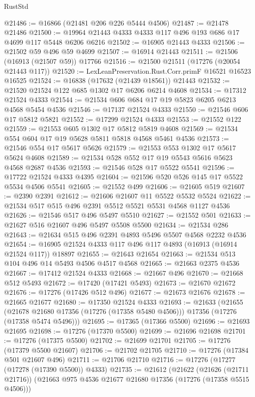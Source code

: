 \begin{lexlean}{RustStd}
\begin{coremodule}
@21486 := @16866 (@21481 @206 @226 @5444 @4506)
@21487 := @21478 @21486
@21500 := @19964 @21443 @4333 @4333 @117 @496 @193 @686 @17 @4699 @117 @5448 @6206 @6216
@21502 := @16905 @21443 @4333
@21506 := @21502 @59 @496 @59 @4699
@21507 := @16914 @21443
@21511 := @21506 (@16913 (@21507 @59)) @17766
@21516 := @21500 @21511 (@17276 (@20054 @21443 @117))
@21520 := LexLeanPreservation.Rust.Corr.primF @16521 @16523 @16525
@21524 := @16838 (@17632 (@21439 @18561)) @21443
@21532 := @21520 @21524 @122 @685 @1302 @17 @6206 @6214 @4608
@21534 := @17312 @21524 @4333
@21544 := @21534 @606 @684 @17 @19 @5823 @6205 @6213 @4568 @5454 @4536
@21546 := @17137 @21524 @4333
@21550 := @21546 @606 @17 @5812 @5821
@21552 := @17299 @21524 @4333
@21553 := @21552 @122
@21559 := @21553 @605 @1302 @17 @5812 @5819 @4608
@21569 := @21534 @554 @604 @17 @19 @5628 @5811 @5818 @4568 @5461 @4536
@21573 := @21546 @554 @17 @5617 @5626
@21579 := @21553 @553 @1302 @17 @5617 @5624 @4608
@21589 := @21534 @528 @552 @17 @19 @5543 @5616 @5623 @4568 @2687 @4536
@21593 := @21546 @528 @17 @5522 @5541
@21596 := @17722 @21524 @4333 @4395
@21604 := @21596 @520 @526 @145 @17 @5522 @5534 @4506 @5541
@21605 := @21552 @499
@21606 := @21605 @519
@21607 := @2390 @2391
@21612 := @21606 @21607 @11 @5522 @5532 @5524
@21622 := @21534 @517 @515 @496 @2391 @5512 @5521 @5531 @4568 @1127 @4536
@21626 := @21546 @517 @496 @5497 @5510
@21627 := @21552 @501
@21633 := @21627 @516 @21607 @496 @5497 @5508 @5500
@21634 := @21534 @286
@21643 := @21634 @515 @496 @2391 @4893 @5496 @5507 @4568 @2232 @4536
@21654 := @16905 @21524 @4333 @117 @496 @117 @4893 (@16913 (@16914 @21524 @117)) @18897
@21655 := @21643 @21654
@21663 := @21534 @513 @104 @496 @14 @5493 @4506 @4517 @4568
@21665 := @21663 @2375 @4536
@21667 := @17412 @21524 @4333
@21668 := @21667 @496
@21670 := @21668 @512 @5493
@21672 := @17420 (@17421 @5493)
@21673 := @21670 @21672
@21676 := @17276 (@17426 @512 @496)
@21677 := @21673 @21676
@21678 := @21665 @21677
@21680 := @17350 @21524 @4333
@21693 := @21633
    (@21655
      (@21678 @21680 @17356 (@17276 (@17358 @5480 @4506)))
      @17356
      (@17276 (@17358 @5474 @5496)))
@21695 := @17365 (@17366 @5500)
@21696 := @21693 @21695
@21698 := @17276 (@17370 @5500)
@21699 := @21696 @21698
@21701 := @17276 (@17375 @5500)
@21702 := @21699 @21701
@21705 := @17276 (@17379 @5500 @21607)
@21706 := @21702 @21705
@21710 := @17276 (@17384 @501 @21607 @496)
@21711 := @21706 @21710
@21716 := @17276 (@17277 (@17278 (@17390 @5500)) @4333)
@21735 := @21612
    (@21622
      (@21626 (@21711 @21716))
      (@21663 @975 @4536 @21677 @21680 @17356 (@17276 (@17358 @5515 @4506)))

\end{coremodule}
\end{lexlean}
